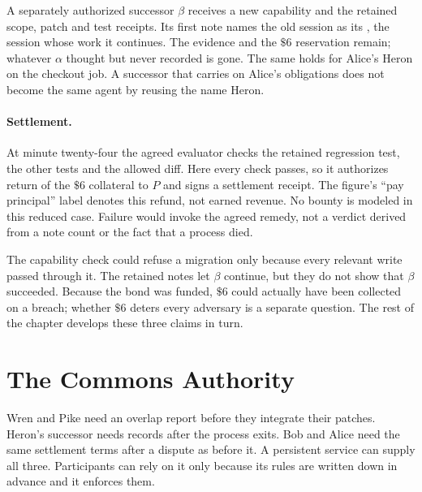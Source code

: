 \documentclass[11pt,a4paper]{article}
\theoremstyle{definition}
\theoremstyle{remark}
\begin{document}
A separately authorized successor $\beta$ receives a new capability and the
retained scope, patch and test receipts. Its first note names the old
session as its , the session whose work it continues.
The evidence and the $\$6$ reservation remain; whatever $\alpha$ thought but
never recorded is gone. The same holds for Alice's Heron on the checkout job.
A successor that carries on Alice's obligations does not become the same
agent by reusing the name Heron.

\paragraph{Settlement.}
At minute twenty-four the agreed evaluator checks the retained regression
test, the other tests and the allowed diff. Here every check passes, so it
authorizes return of the $\$6$ collateral to $P$ and signs a settlement receipt.
The figure's ``pay principal'' label denotes this refund, not earned revenue.
No bounty is modeled in this reduced case. Failure would invoke the agreed
remedy, not a verdict derived from a note count or the fact that a process died.

The capability check could refuse a migration only because every relevant
write passed through it. The retained notes let $\beta$ continue, but they do
not show that $\beta$ succeeded. Because the bond was funded, $\$6$ could
actually have been collected on a breach; whether $\$6$ deters every
adversary is a separate question. The rest of the chapter develops these three claims in turn.

\section{The Commons Authority}\label{sec:commons}
Wren and Pike need an overlap report before they integrate their patches.
Heron's successor needs records after the process exits. Bob and Alice need
the same settlement terms after a dispute as before it. A persistent service
can supply all three. Participants can rely on it only because its rules are
written down in advance and it enforces them.
\end{document}
